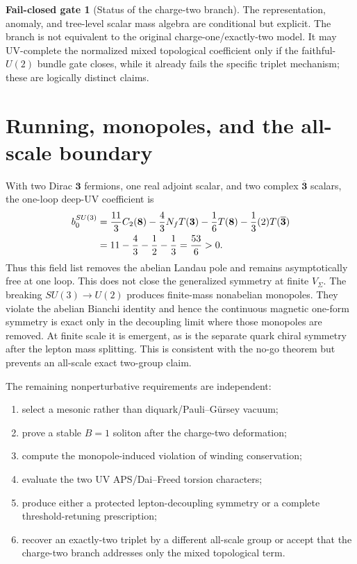 \documentclass[11pt]{article}
\theoremstyle{definition}
\newtheorem{gate}[theorem]{Fail-closed gate}
\theoremstyle{remark}
\newcommand{\status}[1]{\textcolor{blue!60!black}{\textsf{#1}}}
\begin{document}
\begin{gate}[Status of the charge-two branch]
The representation, anomaly, and tree-level scalar mass algebra are
\status{conditional but explicit}.  The branch is not equivalent to the
original charge-one/exactly-two model.  It may UV-complete the normalized
mixed topological coefficient only if the faithful-\(U(2)\) bundle gate
closes, while it already fails the specific triplet mechanism; these are
logically distinct claims.
\end{gate}

\section{Running, monopoles, and the all-scale boundary}

With two Dirac \(\bm3\) fermions, one real adjoint scalar, and two complex
\(\overline{\bm3}\) scalars, the one-loop deep-UV coefficient is
\begin{align}
 b_0^{SU(3)}
 &=\frac{11}{3}C_2(\bm8)
 -\frac43N_fT(\bm3)
 -\frac16T(\bm8)
 -\frac13(2)T(\overline{\bm3})\notag\\
 &=11-\frac43-\frac12-\frac13
 =\frac{53}{6}>0.
 \label{eq:su3-beta}
\end{align}
Thus this field list removes the abelian Landau pole and remains
asymptotically free at one loop.  This does not close the generalized symmetry
at finite \(V_\Sigma\).  The breaking \(SU(3)\to U(2)\) produces finite-mass
nonabelian monopoles.  They violate the abelian Bianchi identity and hence the
continuous magnetic one-form symmetry is exact only in the decoupling limit
where those monopoles are removed.  At finite scale it is emergent, as is the
separate quark chiral symmetry after the lepton mass splitting.  This is
consistent with the no-go theorem but prevents an all-scale exact two-group
claim.

The remaining nonperturbative requirements are independent:
\begin{enumerate}
\item select a mesonic rather than diquark/Pauli--G\"ursey vacuum;
\item prove a stable \(B=1\) soliton after the charge-two deformation;
\item compute the monopole-induced violation of winding conservation;
\item evaluate the two UV APS/Dai--Freed torsion characters;
\item produce either a protected lepton-decoupling symmetry or a complete
  threshold-retuning prescription;
\item recover an exactly-two triplet by a different all-scale group or accept
  that the charge-two branch addresses only the mixed topological term.
\end{enumerate}
\end{document}
